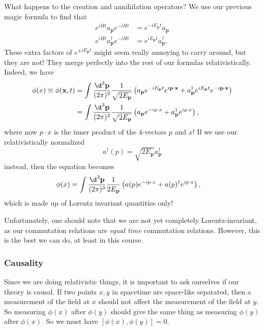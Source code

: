 \documentclass[a4paper]{article}
\begin{document}
What happens to the creation and annihilation operators? We use our previous magic formula to find that
\begin{align*}
  e^{iHt}a_\mathbf{p} e^{-iHt} &= e^{-iE_\mathbf{p} t} a_\mathbf{p}\\
  e^{iHt} a_\mathbf{p}^\dagger e^{-iHt} &= e^{iE_\mathbf{p} t} a_\mathbf{p}^\dagger.
\end{align*}
These extra factors of $e^{\pm iE_\mathbf{p} t}$ might seem really annoying to carry around, but they are not! They merge perfectly into the rest of our formulas relativistically. Indeed, we have
\begin{align*}
  \phi(x) \equiv \phi(\mathbf{x}, t) &= \int \frac{\d^3 \mathbf{p}}{(2\pi)^3}\frac{1}{\sqrt{2 E_\mathbf{p}}} \left(a_\mathbf{p}e^{-iE_\mathbf{p} t} e^{i\mathbf{p}\cdot \mathbf{x}} + a_\mathbf{p}^\dagger e^{iE_\mathbf{p} t} e^{-i\mathbf{p}\cdot \mathbf{x}}\right)\\
  &= \int \frac{\d^3 \mathbf{p}}{(2\pi)^3}\frac{1}{\sqrt{2 E_\mathbf{p}}} \left(a_\mathbf{p} e^{-ip \cdot x} + a_\mathbf{p}^\dagger e^{i p \cdot x}\right),
\end{align*}
where now $p \cdot x$ is the inner product of the $4$-vectors $p$ and $x$! If we use our relativistically normalized
\[
  a^\dagger(p) = \sqrt{2 E_\mathbf{p}} a_\mathbf{p}^\dagger
\]
instead, then the equation becomes
\begin{align*}
  \phi(x) &= \int \frac{\d^3 \mathbf{p}}{(2\pi)^3} \frac{1}{2E_\mathbf{p}}\left(a(p) e^{-ip \cdot x} + a(p)^\dagger e^{i p \cdot x}\right),
\end{align*}
which is made up of Lorentz invariant quantities only!

Unfortunately, one should note that we are not yet completely Lorentz-invariant, as our commutation relations are \emph{equal time} commutation relations. However, this is the best we can do, at least in this course.

\subsubsection*{Causality}
Since we are doing relativistic things, it is important to ask ourselves if our theory is causal. If two points $x, y$ in spacetime are space-like separated, then a measurement of the field at $x$ should not affect the measurement of the field at $y$. So measuring $\phi(x)$ after $\phi(y)$ should give the same thing as measuring $\phi(y)$ after $\phi(x)$. So we must have $[\phi(x), \phi(y)] = 0$.
\end{document}
